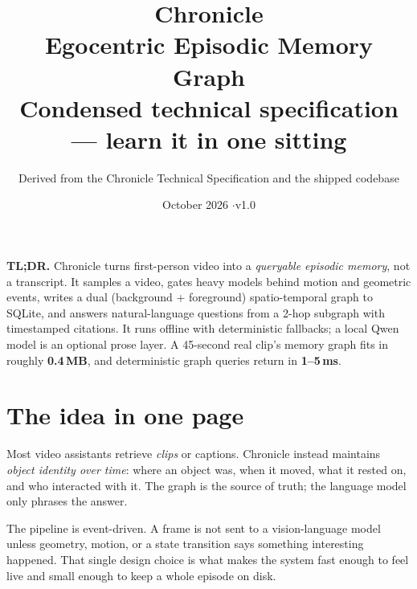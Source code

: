 \documentclass[10pt,a4paper]{article}
\title{\vspace{-1.2cm}\textbf{\LARGE Chronicle}\\[2pt]
\large Egocentric Episodic Memory Graph\\[2pt]
\normalsize\color{muted}Condensed technical specification --- learn it in one sitting}
\author{\normalsize Derived from the Chronicle Technical Specification and the shipped codebase}
\date{\normalsize October 2026 \quad$\cdot$\quad v1.0}
\newcommand{\panel}[1]{%
  \noindent\colorbox{panel}{%
    \begin{minipage}{\dimexpr\linewidth-2\fboxsep\relax}
    \vspace{1pt}#1\vspace{2pt}
    \end{minipage}}%
}
\begin{document}
\maketitle
\vspace{-0.5cm}

\begin{center}
\end{center}

\panel{
\textbf{TL;DR.} Chronicle turns first-person video into a \emph{queryable episodic memory}, not a transcript.
It samples a video, gates heavy models behind motion and geometric events, writes a dual
(background + foreground) spatio-temporal graph to SQLite, and answers natural-language questions
from a 2-hop subgraph with timestamped citations. It runs offline with deterministic fallbacks;
a local Qwen model is an optional prose layer. A 45-second real clip's memory graph fits in
roughly \textbf{0.4\,MB}, and deterministic graph queries return in \textbf{1--5\,ms}.
}

\section{The idea in one page}

Most video assistants retrieve \emph{clips} or captions. Chronicle instead maintains
\emph{object identity over time}: where an object was, when it moved, what it rested on, and who
interacted with it. The graph is the source of truth; the language model only phrases the answer.

The pipeline is event-driven. A frame is not sent to a vision-language model unless geometry,
motion, or a state transition says something interesting happened. That single design choice is
what makes the system fast enough to feel live and small enough to keep a whole episode on disk.
\end{document}
